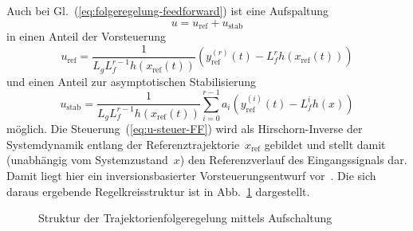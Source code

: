 Auch bei Gl.~(\ref{eq:folgeregelung-feedforward}) ist eine Aufspaltung
\begin{equation}
u=u_{\text{ref}}+u_{\text{stab}}\label{eq:u-aufspaltung-FF}
\end{equation}
in einen Anteil der Vorsteuerung
\begin{equation}
u_{\text{ref}}=\frac{1}{L_{g}L_{f}^{r-1}h(x_{\text{ref}}(t))}\left(y_{\text{ref}}^{(r)}(t)-L_{f}^{r}h(x_{\text{ref}}(t))\right)\label{eq:u-steuer-FF}
\end{equation}
und einen Anteil zur asymptotischen Stabilisierung
\begin{equation}
u_{\text{stab}}=\frac{1}{L_{g}L_{f}^{r-1}h(x_{\text{ref}}(t))}\sum_{i=0}^{r-1}a_{i}\left(y_{\text{ref}}^{(i)}(t)-L_{f}^{i}h(x)\right)\label{eq:u-stab-FF}
\end{equation}
möglich. Die Steuerung~(\ref{eq:u-steuer-FF}) wird als Hirschorn-Inverse
der Systemdynamik entlang der Referenztrajektorie~$x_{\text{ref}}$
gebildet und stellt damit (unabhängig vom Systemzustand~$x$) den
Referenzverlauf des Eingangssignals dar. Damit liegt hier ein inversionsbasierter
Vorsteuerungsentwurf vor~\cite{graichen2006at}. Die sich daraus
ergebende Regelkreisstruktur ist in Abb.~\ref{fig:Trajektorienfolgeregelung-FF}
dargestellt.

\begin{figure}
\begin{centering}
\resizebox{0.95\textwidth}{!}{}
\par\end{centering}
\caption{Struktur der Trajektorienfolgeregelung mittels Aufschaltung\label{fig:Trajektorienfolgeregelung-FF}}
\end{figure}

